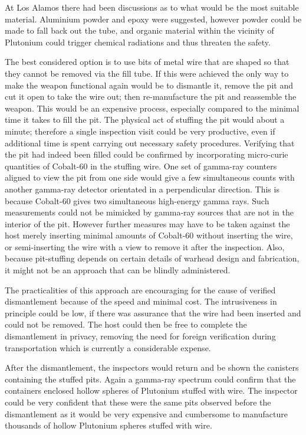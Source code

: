 \documentclass[twoside,titlepage,11pt,twocolumn,a4paper]{article}
\begin{document}
At Los Alamos there had been discussions as to what would be the most
suitable material. Aluminium powder and epoxy were suggested, however
powder could be made to fall back out the tube, and organic material
within the vicinity of Plutonium could trigger chemical radiations and
thus threaten the safety.

The best considered option is to use bits of metal wire that are
shaped so that they cannot be removed via the fill tube.  If this were
achieved the only way to make the weapon functional again would be to
dismantle it, remove the pit and cut it open to take the wire out;
then re-manufacture the pit and reassemble the weapon. This would be
an expensive process, especially compared to the minimal time it takes
to fill the pit.  The physical act of stuffing the pit would about a
minute; therefore a single inspection visit could be very productive,
even if additional time is spent carrying out necessary safety
procedures.  Verifying that the pit had indeed been filled could be
confirmed by incorporating micro-curie quantities of Cobalt-60 in the
stuffing wire. One set of gamma-ray counters aligned to view the pit
from one side would give a few simultaneous counts with another
gamma-ray detector orientated in a perpendicular direction.  This is
because Cobalt-60 gives two simultaneous high-energy gamma rays. Such
measurements could not be mimicked by gamma-ray sources that are not
in the interior of the pit. \citep{zarimpas2003} However further 
measures may have to be taken against the host
merely inserting minimal amounts of Cobalt-60 without inserting the
wire, or semi-inserting the wire with a view to remove it after the
inspection. Also, because pit-stuffing depends on certain details of
warhead design and fabrication, it might not be an approach that can
be blindly administered.

The practicalities of this approach are encouraging for the cause of
verified dismantlement because of the speed and minimal cost. The
intrusiveness in principle could be low, if there was assurance that
the wire had been inserted and could not be removed. The host could
then be free to complete the dismantlement in privacy, removing the
need for foreign verification during transportation which is currently
a considerable expense.

After the dismantlement, the inspectors would return and be shown the
canisters containing the stuffed pits. Again a gamma-ray spectrum
could confirm that the containers enclosed hollow spheres of Plutonium
stuffed with wire. The inspector could be very confident that these
were the same pits observed before the dismantlement as it would be
very expensive and cumbersome to manufacture thousands of hollow
Plutonium spheres stuffed with wire. \citep{matthew1998} 
\end{document}
